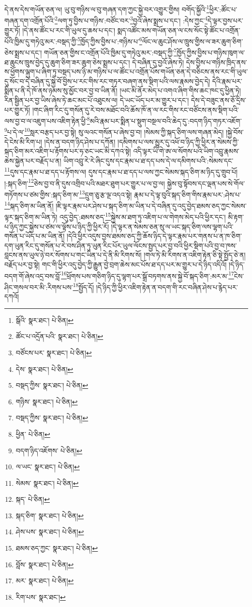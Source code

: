 དེ་ནས་དེས་གཡོན་ཅན་ལ། ཡུ་བུ་གཉིས་ལ་བུ་གཞན་དག་ཀྱང་སྐྱེ་བར་འགྱུར་གྱིས། བགོད་སྐྱོའི་\footnote{སྒོའི་  སྣར་ཐང་།  པེ་ཅིན། }ཕྱིར་:ཚོང་པ་གཞན་དག་འགྲོན་པོའི་\footnote{ཚོང་པ་འདྲོན་པའི་  སྣར་ཐང་།  པེ་ཅིན། }ལག་ཏུ་བྱིས་པ་གཉིས་:བཙོང་བར་\footnote{བཙོངས་པར་  སྣར་ཐང་།  པེ་ཅིན། }བྱའོ་ཞེས་སྨྲས་པ་དང་། :དེས་ཀྱང་\footnote{དེས་  སྣར་ཐང་།  པེ་ཅིན། }དེ་ལྟར་བྱས་པར་གྱུར་ཏོ། །དེ་ནས་ཚོང་པ་རང་གི་ཡུལ་དུ་ཆས་པ་དང་། སྨད་འཚོང་མས་གཡོན་ཅན་ལ་ངས་སོང་སྟེ་ཚོང་པ་འགྲོན་པོའི་ཁྱིམ་དུ་གཏེའུ་མར་:བསྡད་ཀྱི་\footnote{བསྡད་ཀྱིས་  སྣར་ཐང་།  པེ་ཅིན། }ཁྱོད་ཀྱིས་བྱིས་པ་:གཉིས་པ་\footnote{གཉིས་  སྣར་ཐང་།  པེ་ཅིན། }ལོང་ལ་ཆུང་ཤོས་ལ་ཁྲུས་གྱིས་ལ་ཟར་ཆུག་ཅིག་ཅེས་སྨྲས་པ་དང་། གཡོན་ཅན་གྱིས་ང་འགྲོན་པོའི་ཁྱིམ་དུ་གཏེའུ་མར་:བསྡད་ཀྱི་\footnote{བསྡད་ཀྱིས་  སྣར་ཐང་།  པེ་ཅིན། }ཁྱོད་ཀྱིས་བྱིས་པ་གཉིས་ཁུག་ལ་ཐ་ཆུངས་ཁྲུས་བྱེད་དུ་ཆུག་ཅིག་ཟར་ཆུག་ཅེས་སྨྲས་པ་དང་། དེ་བཞིན་དུ་བྱའོ་ཞེས་ཏེ། དེས་བྱིས་པ་གཉིས་ཁྲིད་ནས་ས་ཕྱོགས་ལྐུག་པ་ཞིག་ཏུ་བསྡད་པས་ཉི་མ་གཉིས་པ་ལ་ཚོང་པ་འགྲོན་པོས་གཡོན་ཅན་དེ་བཅིངས་ནས་རང་གི་ཡུལ་དུ་སོང་བ་དེ་བཞིན་དུ་སྐྱེ་བོ་བྱིས་པ་རང་གིས་རང་གཏར་བཞག་ནས་སྡིག་པའི་ལས་རྣམས་བྱེད་དེ། དེའི་རྣམ་པར་སྨིན་པ་ནི་དེ་ཁོ་ནས་ཉམས་སུ་མྱོང་བར་བྱ་བ་ཡིན་ནོ། །ཡང་མི་ནོར་མེད་པ་འགའ་ཞིག་གིས་ཆང་ཁང་དུ་ཕྱིན་ཏེ། རིན་སྦྱིན་པར་བྱ་ཡིས་ཞེས་ཏེ་ཆང་མང་པོ་འཐུངས་ལ། དེ་ཡང་ཡོད་པར་མ་གྱུར་པ་དང་། དེས་དེ་བཟུང་ནས་ཅོ་དྲིས་པར་གྱུར་ཏོ། །གང་ཞིག་རིང་དུ་གསོན་དུ་རེ་བས་མཐོང་བའི་ཆོས་ཁོ་ན་ལ་རང་གིས་རང་བཙོངས་ནས་སྡིག་པའི་ལས་བྱ་བ་ལ་འཇུག་པས་འཇིག་རྟེན་ཕྱི་\footnote{ཕྱིན་  པེ་ཅིན། }མའི་རྣམ་པར་སྨིན་པ་སྡུག་བསྔལ་བའི་ཆེད་དུ་:བདག་ཉིད་གཏར་འཇོག་\footnote{བདག་ཉིད་འཇོགས་  པེ་ཅིན། }པ་དེ་ལ་\footnote{ལ་ཡང་  སྣར་ཐང་།  པེ་ཅིན། }སླར་བརྩད་པར་བྱ་སྟེ། སུ་ལའང་གསོན་པ་ཞེས་བྱ་བ། །སེམས་ཀྱི་སྐད་ཅིག་ལས་གཞན་མེད། །སྐྱེ་བོས་དེ་ངེས་མི་རིག་པ། །དེས་ན་བདག་ཉིད་ཤེས་པ་དཀོན། །དམིགས་པ་ལས་མྱུར་དུ་འཕོ་བ་ཉིད་ཀྱི་ཕྱིར་ན་སེམས་ཀྱི་སྐད་ཅིག་མར་འཇིག་པ་རྟོགས་པར་ཧ་ཅང་ཡང་མི་དཀའ་སྟེ། འདི་ལྟར་ཡི་གེ་ཨ་ལ་སོགས་པའི་ཡིག་འབྲུ་རྣམས་ཆེས་སྐྱེན་པར་བརྗོད་པ་ན། ཡིག་འབྲུ་རེ་རེ་ཞིང་དུས་དང་རྣམ་པ་ཐ་དད་པས་དེ་ལ་དམིགས་པའི་:སེམས་དང་\footnote{སེམས་  སྣར་ཐང་།  པེ་ཅིན། }དུས་དང་རྣམ་པ་ཐ་དད་པ་རྟོགས་ལ། དུས་དང་རྣམ་པ་ཐ་དད་པ་ལས་ཀྱང་སེམས་སྐད་ཅིག་མ་ཉིད་དུ་གྲུབ་པོ། །:སྐད་ཅིག་\footnote{སྐད་  པེ་ཅིན། }ཅེས་བྱ་བ་ནི་དུས་འགྲིབ་པའི་མཐར་ཐུག་པར་གྱུར་པ་ལ་བྱ་ལ། སྐྱེས་བུ་སྟོབས་དང་ལྡན་པས་སེ་གོལ་གཏོགས་པ་ཙམ་གྱིས་:སྐད་ཅིག་མ་\footnote{སྐད་ཅིག་  སྣར་ཐང་།  པེ་ཅིན། }དྲུག་ཅུ་རྩ་ལྔ་འདའ་སྟེ། རྣམ་པ་དེ་ལྟ་བུའི་སྐད་ཅིག་གིས་རྣམ་པར་:ཤེས་པ་\footnote{ཤེས་པས་  སྣར་ཐང་།  པེ་ཅིན། }སྐད་ཅིག་མ་ཡིན་ནོ། །ཇི་ལྟར་རྣམ་པར་ཤེས་པ་སྐད་ཅིག་མ་ཡིན་པ་དེ་བཞིན་དུ་འདུ་བྱེད་ཐམས་ཅད་ཀྱང་སེམས་ལྟར་སྐད་ཅིག་མ་ཡིན་ཏེ། འདུ་བྱེད་:ཐམས་ཅད་\footnote{ཐམས་ཅད་ཀྱང་  སྣར་ཐང་།  པེ་ཅིན། }སྐྱེས་མ་ཐག་ཏུ་འཇིག་པ་ལ་གེགས་མེད་པའི་ཕྱིར་དང་། མི་རྟག་པ་ཉིད་ཀྱང་སྐྱེས་པ་ཙམ་ལ་ལྟོས་པ་ཉིད་ཀྱི་ཕྱིར་རོ། །དེ་ལྟར་ན་སེམས་ཅན་སུ་ལ་ཡང་སྐད་ཅིག་ལས་ལྷག་པའི་གསོན་པ་ཡོད་པ་མ་ཡིན་ནོ། །དེའི་ཕྱིར་འདུས་བྱས་ཐམས་ཅད་ཀྱི་ཆོས་ཉིད་དེ་ལྟར་རྣམ་པར་གནས་པ་ན་ཁ་ཅིག་དག་ཡུན་རིང་དུ་གསོན་པ་རེ་བས་ཤིན་ཏུ་ཡུན་རིང་པོར་ཡུལ་ལོངས་སྤྱད་པར་བྱ་བའི་ཕྱིར་སྡིག་པའི་བྱ་བ་ཁས་བླངས་ནས་ཡུལ་ཉེ་བར་སོགས་པ་གང་ཡིན་པ་དེ་ནི་མི་རིགས་སོ། །གལ་ཏེ་མི་རིགས་ན་འཇིག་རྟེན་ཅི་སྟེ་སྤྱོད་ཅེ་ན། བརྗོད་པར་བྱ་སྟེ། གང་གི་ཕྱིར་འདུ་བྱེད་ཀྱི་རྒྱུན་བྱེ་བྲག་ཆེས་མང་པོས་ཐ་དད་པར་མ་གྱུར་པ་དེ་ཉིད་འདིའོ། །དེ་ཉིད་བདག་གོ་ཞེས་འདྲ་བས་བློ་\footnote{བློས་  སྣར་ཐང་།  པེ་ཅིན། }ཕྲོགས་པས་གཅིག་ཉིད་དུ་ལྷག་པར་སྒྲོ་བཏགས་ནས་སྐྱེ་བོ་སྐད་ཅིག་:མར་མ་\footnote{མར་  སྣར་ཐང་།  པེ་ཅིན། }ངེས་ཤིང་གསལ་བར་མི་:རིགས་པས་\footnote{རིག་པས་  སྣར་ཐང་། }སྤྱོད་དོ། །དེ་ཉིད་ཀྱི་ཕྱིར་འཇིག་རྟེན་ན་བདག་གི་རང་བཞིན་ཤེས་པ་རྙེད་པར་དཀའོ། 